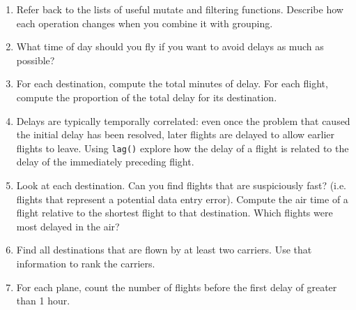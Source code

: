 \documentclass[11pt,a4paper]{article}
\begin{document}
\begin{enumerate}
	\item Refer back to the lists of useful mutate and filtering functions. Describe how each operation changes when you combine it with grouping.
	
	\item What time of day should you fly if you want to avoid delays as much as possible?
	
	\item For each destination, compute the total minutes of delay. For each flight, compute the proportion of the total delay for its destination.
	
	\item Delays are typically temporally correlated: even once the problem that caused the initial delay has been resolved, later flights are delayed to allow earlier flights to leave. Using \texttt{lag()} explore how the delay of a flight is related to the delay of the immediately preceding flight.
	
	\item Look at each destination. Can you find flights that are suspiciously fast? (i.e. flights that represent a potential data entry error). Compute the air time of a flight relative to the shortest flight to that destination. Which flights were most delayed in the air?
	
	\item Find all destinations that are flown by at least two carriers. Use that information to rank the carriers.
	
	\item For each plane, count the number of flights before the first delay of greater than 1 hour.
	
	
\end{enumerate}
\end{document}
